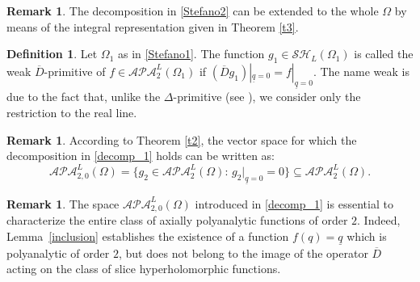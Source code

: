 \documentclass[reqno,11pt]{amsart}
\numberwithin{equation}{section}
\theoremstyle{definition}
\newtheorem{remark}[theorem]{{\bf Remark}}
\newtheorem{definition}[theorem]{Definition}
\begin{document}
\begin{remark}
The decomposition in \eqref{Stefano2} can be extended to the whole $\Omega$ by means of the integral representation given in Theorem \ref{t3}.
\end{remark}

\begin{definition}
\label{Dprim}
	Let $\Omega_1$ as in \eqref{Stefano1}. The function $g_1\in \mathcal{SH}_L(\Omega_1)$ is called the weak $\overline D$-primitive of $f\in \mathcal{APA}_2^L(\Omega_1)$ if $(\overline D{g_1})|_{\underline q=0}=f |_{\underline q=0}$. The name weak is due to the fact that, unlike the $\Delta$-primitive (see \cite{CSSOinverse}), we consider only the restriction to the real line.
\end{definition}

\begin{remark}
According to Theorem \ref{t2}, the vector space for which the decomposition in \eqref{decomp_1} holds can be written as:
\begin{equation}
	\label{newpsace}
\mathcal{APA}^L_{2,0}(\Omega) =\{g_2\in \mathcal{APA}^L_2(\Omega): \, g_2|_{\underline q=0}=0\}\subseteq \mathcal{APA}^L_2(\Omega).
\end{equation}
\end{remark}

\begin{remark}\label{r1}
The space $\mathcal{APA}^L_{2,0}(\Omega) $ introduced in \eqref{decomp_1} is essential to characterize the entire class of axially polyanalytic functions of order $2$. Indeed, Lemma~\ref{inclusion} establishes the existence of a function $f(q)=\underline{q}$ which is polyanalytic of order $2$, but does not belong to the image of the operator $\overline{D}$ acting on the class of slice hyperholomorphic functions.
\end{remark}
\end{document}
